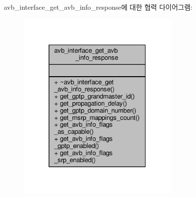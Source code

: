 avb\+\_\+interface\+\_\+get\+\_\+avb\+\_\+info\+\_\+response에 대한 협력 다이어그램\+:
\nopagebreak
\begin{figure}[H]
\begin{center}
\leavevmode
\includegraphics[width=229pt]{classavdecc__lib_1_1avb__interface__get__avb__info__response__coll__graph}
\end{center}
\end{figure}
